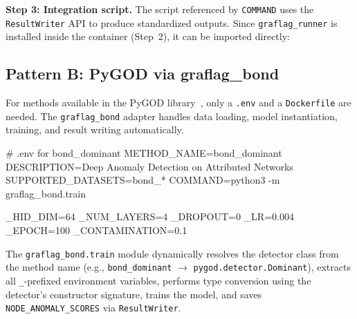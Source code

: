 \documentclass[twoside,11pt]{article}
\begin{document}
\textbf{Step 3: Integration script.} The script referenced by \texttt{COMMAND} uses the \texttt{ResultWriter} API to produce standardized outputs. Since \texttt{graflag\_runner} is installed inside the container (Step~2), it can be imported directly:


\subsection{Pattern B: PyGOD via graflag\_bond}

For methods available in the PyGOD library~\citep{liu2024pygod}, only a \texttt{.env} and a \texttt{Dockerfile} are needed. The \texttt{graflag\_bond} adapter handles data loading, model instantiation, training, and result writing automatically.

\begin{codebox}
# .env for bond_dominant
METHOD_NAME=bond_dominant
DESCRIPTION=Deep Anomaly Detection on Attributed Networks
SUPPORTED_DATASETS=bond_*
COMMAND=python3 -m graflag_bond.train

_HID_DIM=64
_NUM_LAYERS=4
_DROPOUT=0
_LR=0.004
_EPOCH=100
_CONTAMINATION=0.1
\end{codebox}

The \texttt{graflag\_bond.train} module dynamically resolves the detector class from the method name (e.g., \texttt{bond\_dominant} $\rightarrow$ \texttt{pygod.detector.Dominant}), extracts all \texttt{\_}-prefixed environment variables, performs type conversion using the detector's constructor signature, trains the model, and saves \texttt{NODE\_ANOMALY\_SCORES} via \texttt{ResultWriter}.
\end{document}
